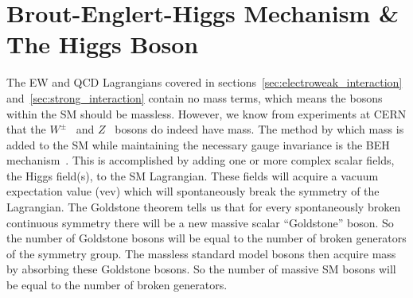 \section{Brout-Englert-Higgs Mechanism \& The Higgs Boson}
\label{sec:higgs_mechanism}

The EW and QCD Lagrangians covered in sections~\ref{sec:electroweak_interaction} and~\ref{sec:strong_interaction} contain no mass terms, which means the bosons within the SM should be massless.
However, we know from experiments at CERN that the $W^{\pm}$~\cite{ARNISON1983103} and $Z$~\cite{1983398} bosons do indeed have mass.
The method by which mass is added to the SM while maintaining the necessary gauge invariance is the BEH mechanism~\cite{PhysRevLett.13.321,PhysRevLett.13.508}.
This is accomplished by adding one or more complex scalar fields, the Higgs field(s), to the SM Lagrangian.
These fields will acquire a vacuum expectation value (vev) which will spontaneously break the symmetry of the Lagrangian.
The Goldstone theorem tells us that for every spontaneously broken continuous symmetry there will be a new massive scalar ``Goldstone'' boson.
So the number of Goldstone bosons will be equal to the number of broken generators of the symmetry group.
The massless standard model bosons then acquire mass by absorbing these Goldstone bosons.
So the number of massive SM bosons will be equal to the number of broken generators.

